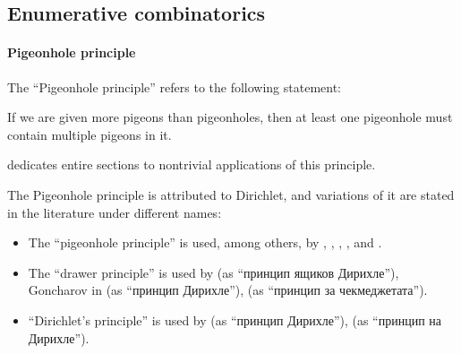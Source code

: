 \subsection{Enumerative combinatorics}\label{subsec:enumerative_combinatorics}

\paragraph{Pigeonhole principle}

\begin{remark}\label{rem:pigeonhole_principle}
  The \enquote{Pigeonhole principle} refers to the following statement:
  \begin{displayquote}
    If we are given more pigeons than pigeonholes, then at least one pigeonhole must contain multiple pigeons in it.
  \end{displayquote}

   dedicates entire sections to nontrivial applications of this principle.

  The Pigeonhole principle is attributed to Dirichlet, and variations of it are stated in the literature under different names:
  \begin{itemize}
    \item The \enquote{pigeonhole principle} is used, among others, by , , , ,  and .
    \item The \enquote{drawer principle} is used by  (as \enquote{принцип ящиков Дирихле}), Goncharov in \cite[156]{АлександровМаркушевичХинчин1952ЭнциклопедияТом3} (as \enquote{принцип Дирихле}),  (as \enquote{принцип за чекмеджетата}).
    \item \enquote{Dirichlet's principle} is used by  (as \enquote{принцип Дирихле}),  (as \enquote{принцип на Дирихле}).
  \end{itemize}
\end{remark}

